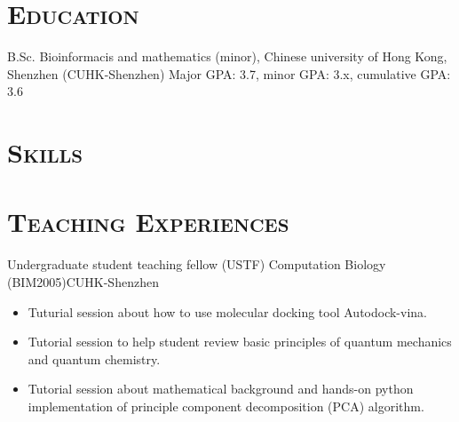 \documentclass[11pt,a4paper]{moderncv}
\newcommand{\cvsection}[1]{\section{\textsc{#1}}}
\begin{document}
\maketitle

\cvsection{Education}
        {B.Sc.}
        {}
        {Bioinformacis and mathematics (minor), Chinese university of Hong Kong, Shenzhen (CUHK-Shenzhen)}
        {}
        {Major GPA: 3.7, minor GPA: 3.x, cumulative GPA: 3.6}

\cvsection{Skills}

\cvsection{Teaching Experiences}
        {Undergraduate student teaching fellow (USTF)}{}
        {Computation Biology (BIM2005)}{CUHK-Shenzhen}
        {
            \begin{itemize}
                \item Tuturial session about how to use molecular docking tool Autodock-vina.
                \item Tutorial session to help student review basic principles of quantum mechanics and quantum chemistry.
                \item Tutorial session about mathematical background and hands-on python implementation of principle component decomposition (PCA) algorithm.
            \end{itemize}
        }
\end{document}

